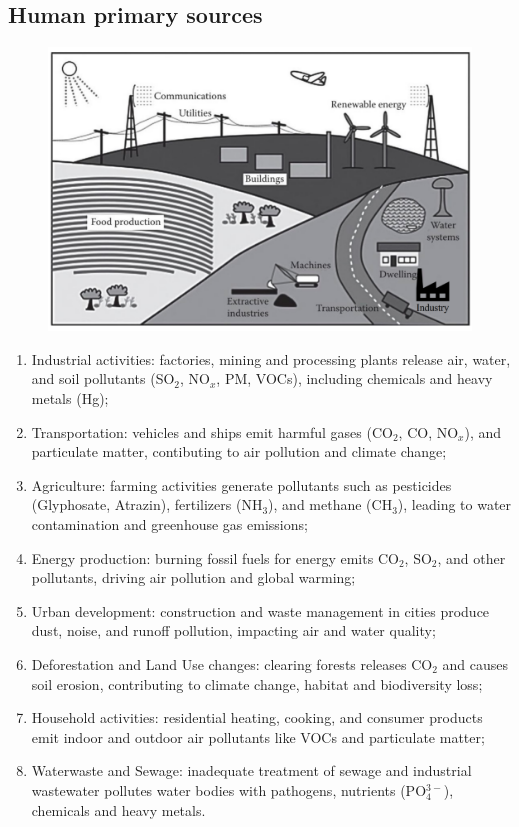 \documentclass{article}
\newcommand{\cfig}[1]{%
  \begin{figure}[ht!]%
    \centering%
    #1%
  \end{figure}%
}
\begin{document}
\subsection{Human primary sources}
\cfig{\includegraphics*[width=.8\textwidth]{media/anthrosphere.png}}
\begin{enumerate}
    \item Industrial activities: factories, mining and processing plants release air,
        water, and soil pollutants (SO$_2$, NO$_x$, PM, VOCs), including
        chemicals and heavy metals (Hg);
    \item Transportation: vehicles and ships emit harmful gases (CO$_2$, CO, NO$_x$),
        and particulate matter, contibuting to air pollution and climate change;
    \item Agriculture: farming activities generate pollutants such as pesticides (Glyphosate, Atrazin),
        fertilizers (NH$_3$), and methane (CH$_3$), leading to water contamination
        and greenhouse gas emissions;
    \item Energy production: burning fossil fuels for energy emits CO$_2$, SO$_2$,
        and other pollutants, driving air pollution and global warming;
    \item Urban development: construction and waste management in cities produce dust,
        noise, and runoff pollution, impacting air and water quality;
    \item Deforestation and Land Use changes: clearing forests releases CO$_2$ and
        causes soil erosion, contributing to climate change, habitat and biodiversity loss;
    \item Household activities: residential heating, cooking, and consumer products
        emit indoor and outdoor air pollutants like VOCs and particulate matter;
    \item Waterwaste and Sewage: inadequate treatment of sewage and industrial wastewater
        pollutes water bodies with pathogens, nutrients (PO$_4^{3-}$), chemicals and heavy metals.
\end{enumerate}
\end{document}
